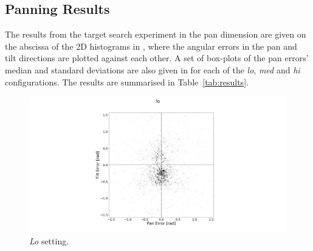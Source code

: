 \documentclass[sigconf, review=true, screen=true, anonymous=true]{acmart}
\begin{document}




\subsection{Panning Results}

The results from the target search experiment in the pan dimension are given on the abscissa of the 2D histograms in , where the angular errors in the pan and tilt directions are plotted against each other.
A set of box-plots of the pan errors' median and standard deviations are also given in  for each of the \emph{lo}, \emph{med} and \emph{hi} configurations.
The results are summarised in Table~\ref{tab:results}.

\begin{figure}
  \centering
  \includegraphics[clip, trim=450 0 450 110, width=0.8\columnwidth]{figures/err_lo.png}
  \caption{\emph{Lo} setting. }\label{fig:err-results-lo}
\end{figure}
\end{document}
